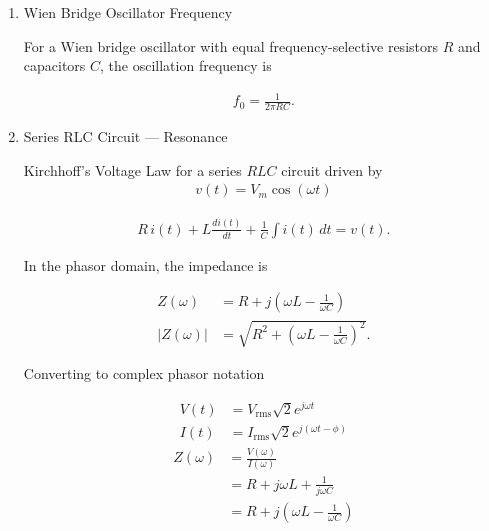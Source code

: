 \begin{enumerate}[label=\thesubsection.\arabic*,ref=\thesubsection.\theenumi]
\begin{align}
V_{\text{out}}=-\left(\frac{R_f}{R_1}V_1+\frac{R_f}{R_2}V_2+\frac{R_f}{R_3}V_3+\cdots\right), \label{amplifier}
\end{align}

valid provided $V_{\text{out}}$ stays within the saturation limits,

\begin{align}
-V_{\text{sat}}\le V_{\text{out}}\le +V_{\text{sat}}.
\end{align}

\item Wien Bridge Oscillator Frequency

For a Wien bridge oscillator with equal frequency-selective resistors
$R$ and capacitors $C$, the oscillation frequency is

\begin{align}
f_0=\frac{1}{2\pi RC}. \label{wien}
\end{align}

\item Series RLC Circuit --- Resonance \label{resonance}

Kirchhoff's Voltage Law for a series $RLC$ circuit driven by
\begin{align}
v(t)=V_m\cos(\omega t)
\end{align}

\begin{align}
R\,i(t)+L\frac{di(t)}{dt}+\frac{1}{C}\int i(t)\,dt=v(t).
\end{align}

In the phasor domain, the impedance is

\begin{align}
Z(\omega)&=R+j\left(\omega L-\frac{1}{\omega C}\right)\\
|Z(\omega)|&=\sqrt{R^{2}+\left(\omega L-\frac{1}{\omega C}\right)^{2}}.
\end{align}

Converting to complex phasor notation 

\begin{align}
V(t) &= V_{\text{rms}} \sqrt{2} e^{j\omega t}\\
I(t) &= I_{\text{rms}} \sqrt{2} e^{j(\omega t - \phi)}
\end{align}
\begin{align}
Z(\omega) &= \frac{V(\omega)}{I(\omega)}\\
&= R + j\omega L + \frac{1}{j\omega C} \\
&= R + j\left(\omega L - \frac{1}{\omega C}\right)
\end{align}


\end{enumerate}
